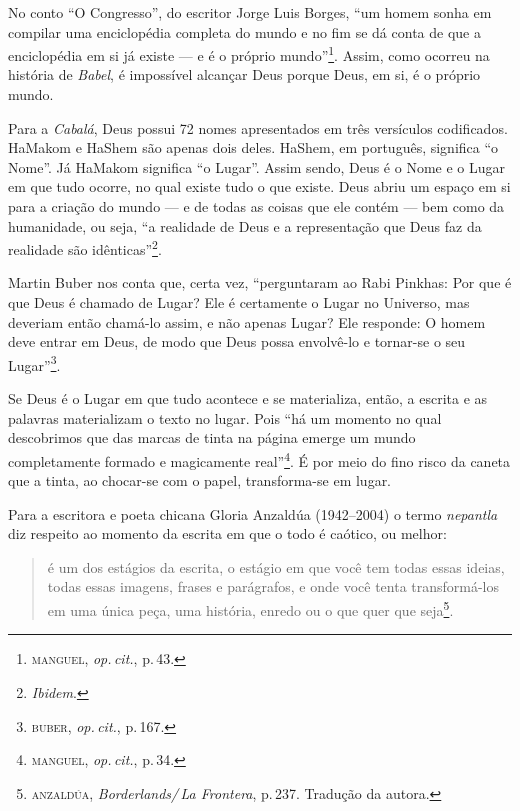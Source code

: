 No conto ``O Congresso'', do escritor Jorge Luis Borges, ``um
homem sonha em compilar uma enciclopédia completa do mundo e no fim se
dá conta de que a enciclopédia em si já existe --- e é o próprio
mundo''\footnote{\textsc{manguel}, \emph{op.\,cit.}, p.\,43.}. Assim, como ocorreu na
história de \emph{Babel}, é impossível alcançar Deus porque Deus, em si,
é o próprio mundo.

Para a \emph{Cabalá}, Deus possui 72 nomes apresentados em três
versículos codificados. HaMakom e HaShem são apenas dois deles. HaShem,
em português, significa ``o Nome''. Já HaMakom significa ``o Lugar''.
Assim sendo, Deus é o Nome e o Lugar em que tudo ocorre, no qual existe
tudo o que existe. Deus abriu um espaço em si para a criação do mundo
--- e de todas as coisas que ele contém --- bem como da humanidade, ou
seja, ``a realidade de Deus e a representação que Deus faz da
realidade são idênticas''\footnote{\emph{Ibidem}.}.

Martin Buber nos conta que, certa vez, ``perguntaram ao Rabi
Pinkhas: Por que é que Deus é chamado de Lugar? Ele é certamente o
Lugar no Universo, mas deveriam então chamá-lo assim, e não apenas
Lugar? Ele responde: O homem deve entrar em Deus, de modo que Deus
possa envolvê-lo e tornar-se o seu Lugar''\footnote{\textsc{buber}, \emph{op.\,cit.}, p.\,167.}.

Se Deus é o Lugar em que tudo acontece e se materializa, então, a
escrita e as palavras materializam o texto no lugar. Pois ``há um
momento no qual descobrimos que das marcas de tinta na página emerge um
mundo completamente formado e magicamente real''\footnote{\textsc{manguel}, \emph{op.\,cit.}, p.\,34.}. É por meio do fino risco da caneta que a tinta, ao
chocar-se com o papel, transforma-se em lugar.

\begin{center}\end{center}

\noindent{}Para a escritora e poeta chicana Gloria Anzaldúa (1942--2004) o termo
\emph{nepantla} diz respeito ao momento da escrita em que o todo é
caótico, ou melhor:

\begin{quote}
é um dos estágios da escrita, o estágio em que você tem todas essas
ideias, todas essas imagens, frases e parágrafos, e onde você tenta
transformá-los em uma única peça, uma história, enredo ou o que quer que
seja\footnote{\textsc{anzaldúa}, \emph{Borderlands/\,La Frontera}, p.\,237. Tradução da autora.}.
\end{quote}

